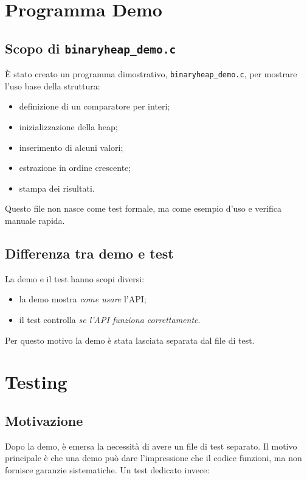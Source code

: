 \documentclass[a4paper,12pt]{article}
\begin{document}
\section{Programma Demo}

\subsection{Scopo di \texttt{binaryheap\_demo.c}}

È stato creato un programma dimostrativo, \texttt{binaryheap\_demo.c}, per mostrare l'uso base della struttura:

\begin{itemize}[leftmargin=*]
    \item definizione di un comparatore per interi;
    \item inizializzazione della heap;
    \item inserimento di alcuni valori;
    \item estrazione in ordine crescente;
    \item stampa dei risultati.
\end{itemize}

Questo file non nasce come test formale, ma come esempio d'uso e verifica manuale rapida.

\subsection{Differenza tra demo e test}

La demo e il test hanno scopi diversi:

\begin{itemize}[leftmargin=*]
    \item la demo mostra \emph{come usare} l'API;
    \item il test controlla \emph{se l'API funziona correttamente}.
\end{itemize}

Per questo motivo la demo è stata lasciata separata dal file di test.

\section{Testing}

\subsection{Motivazione}

Dopo la demo, è emersa la necessità di avere un file di test separato. Il motivo principale è che una demo può dare l'impressione che il codice funzioni, ma non fornisce garanzie sistematiche. Un test dedicato invece:
\end{document}
